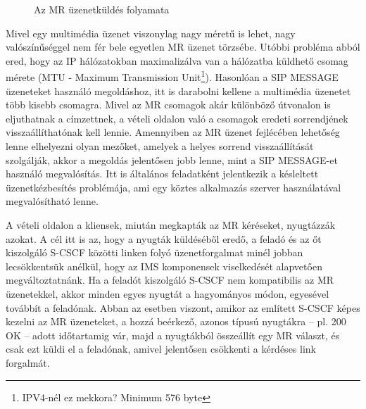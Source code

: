 \begin{figure}[htbp]
\center
{}
\caption{Az MR üzenetküldés folyamata}
\label{fig:mrflow}
\end{figure}

Mivel egy multimédia üzenet viszonylag nagy méretű is lehet, nagy valószínűséggel nem fér bele egyetlen MR üzenet törzsébe. Utóbbi probléma abból ered, hogy az IP hálózatokban maximalizálva van a hálózatba küldhető csomag mérete (MTU - Maximum Transmission Unit\footnote{IPV4-nél ez mekkora? Minimum 576 byte}). Hasonlóan a SIP MESSAGE üzeneteket használó megoldáshoz, itt is darabolni kellene a multimédia üzenetet több kisebb csomagra. Mivel az MR csomagok akár különböző útvonalon is eljuthatnak a címzettnek, a vételi oldalon való a csomagok eredeti sorrendjének visszaállíthatónak kell lennie. Amennyiben az MR üzenet fejlécében lehetőség lenne elhelyezni olyan mezőket, amelyek a helyes sorrend visszaállítását szolgálják, akkor a megoldás jelentősen jobb lenne, mint a SIP MESSAGE-et használó megvalósítás. Itt is általános feladatként jelentkezik a késleltett üzenetkézbesítés problémája, ami egy köztes alkalmazás szerver használatával megvalósítható lenne.

A vételi oldalon a kliensek, miután megkapták az MR kéréseket, nyugtázzák azokat. A cél itt is az, hogy a nyugták küldéséből eredő, a feladó és az őt kiszolgáló S-CSCF közötti linken folyó üzenetforgalmat minél jobban lecsökkentsük anélkül, hogy az IMS komponensek viselkedését alapvetően megváltoztatnánk. Ha a feladót kiszolgáló S-CSCF nem kompatibilis az MR üzenetekkel, akkor minden egyes nyugtát a hagyományos módon, egyesével továbbít a feladónak. Abban az esetben viszont, amikor az említett S-CSCF képes kezelni az MR üzeneteket, a hozzá beérkező, azonos típusú nyugtákra -- pl. 200 OK -- adott időtartamig vár, majd a nyugtákból összeállít egy MR választ, és csak ezt küldi el a feladónak, amivel jelentősen csökkenti a kérdéses link forgalmát.

